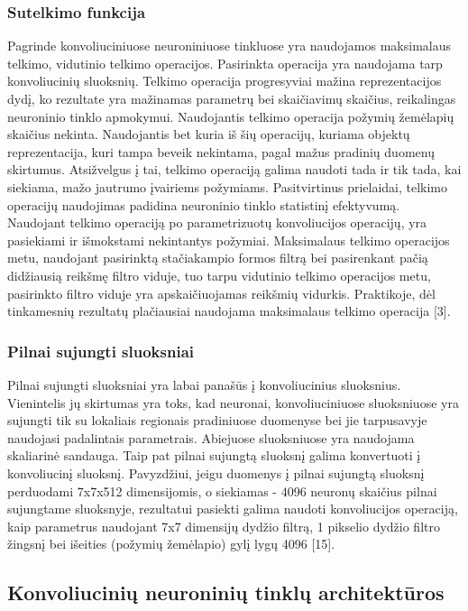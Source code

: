 \documentclass{VUMIFInfBakalaurinis}
\begin{document}
\subsubsection{Sutelkimo funkcija}
Pagrinde konvoliuciniuose neuroniniuose tinkluose yra naudojamos maksimalaus telkimo, vidutinio telkimo operacijos. Pasirinkta operacija yra naudojama tarp konvoliucinių sluoksnių. Telkimo operacija progresyviai mažina reprezentacijos dydį, ko rezultate yra mažinamas parametrų bei skaičiavimų skaičius, reikalingas neuroninio tinklo apmokymui. Naudojantis telkimo operacija požymių žemėlapių skaičius nekinta. Naudojantis bet kuria iš šių operacijų, kuriama objektų reprezentacija, kuri tampa beveik nekintama, pagal mažus pradinių duomenų skirtumus. Atsižvelgus į tai, telkimo operaciją galima naudoti tada ir tik tada, kai siekiama, mažo jautrumo įvairiems požymiams. Pasitvirtinus prielaidai, telkimo operacijų naudojimas padidina neuroninio tinklo statistinį efektyvumą. Naudojant telkimo operaciją po parametrizuotų konvoliucijos operacijų, yra pasiekiami ir išmokstami nekintantys požymiai. Maksimalaus telkimo operacijos metu, naudojant pasirinktą stačiakampio formos filtrą bei pasirenkant pačią didžiausią reikšmę filtro viduje, tuo tarpu vidutinio telkimo operacijos metu, pasirinkto  filtro viduje yra apskaičiuojamas reikšmių vidurkis. Praktikoje, dėl tinkamesnių rezultatų plačiausiai naudojama maksimalaus telkimo operacija [3]. 

\subsubsection{Pilnai sujungti sluoksniai}
Pilnai sujungti sluoksniai yra labai panašūs į konvoliucinius sluoksnius. Vienintelis jų skirtumas yra toks, kad neuronai, konvoliuciniuose sluoksniuose yra sujungti tik su lokaliais regionais pradiniuose duomenyse bei jie tarpusavyje  naudojasi padalintais parametrais. Abiejuose sluoksniuose yra naudojama skaliarinė sandauga. Taip pat pilnai sujungtą sluoksnį galima konvertuoti į konvoliucinį sluoksnį. Pavyzdžiui, jeigu duomenys į pilnai sujungtą sluoksnį perduodami 7x7x512 dimensijomis, o siekiamas - 4096 neuronų skaičius pilnai sujungtame sluoksnyje, rezultatui pasiekti galima naudoti konvoliucijos operaciją, kaip parametrus naudojant 7x7 dimensijų dydžio filtrą, 1 pikselio dydžio filtro žingsnį bei išeities (požymių žemėlapio) gylį lygų 4096 [15]. 

\subsection{Konvoliucinių neuroninių tinklų architektūros}
\end{document}
